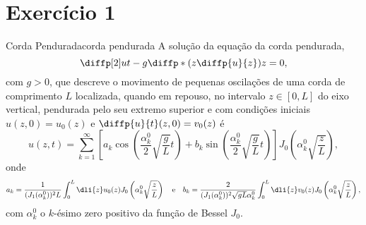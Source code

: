 \section*{Exercício 1}
\begin{proposition}{Corda Pendurada}{corda pendurada}
    A solução da equação da corda pendurada,
    \begin{equation*}
        \diffp[2]ut - g\diffp*{\left(z \diffp{u}{z}\right)}{z} = 0,
    \end{equation*}
    com \(g > 0\), que descreve o movimento de pequenas oscilações de uma corda de comprimento \(L\) localizada, quando em repouso, no intervalo \(z\in [0, L]\) do eixo vertical, pendurada pelo seu extremo superior e com condições iniciais \(u(z, 0) = u_0(z)\) e \(\diffp{u}{t}(z,0) = v_0(z)\) é
    \begin{equation*}
        u(z, t) = \sum_{k = 1}^\infty \left[a_k \cos\left(\frac{\alpha_k^0}{2}\sqrt{\frac{g}{L}}t\right)+b_k \sin\left(\frac{\alpha_k^0}{2}\sqrt{\frac{g}{L}}t\right)\right] J_0\left(\alpha_k^0 \sqrt{\frac{z}{L}}\right),
    \end{equation*}
    onde
    \begin{equation*}
        a_k = \frac{1}{(J_1(\alpha_k^0))^2L} \int_0^L \dli{z} u_0(z) J_0\left(\alpha_k^0\sqrt{\frac{z}{L}}\right)\quad\text{e}\quad
        b_k = \frac{2}{(J_1(\alpha_k^0))^2\sqrt{gL} \alpha_k^0} \int_0^L \dli{z} v_0(z) J_0\left(\alpha_k^0\sqrt{\frac{z}{L}}\right),
    \end{equation*}
    com \(\alpha_k^0\) o \(k\)-ésimo zero positivo da função de Bessel \(J_0\).
\end{proposition}
